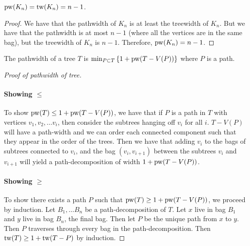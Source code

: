 \begin{example}
	\(\operatorname{pw}(K_n) = \operatorname{tw}(K_n) = n - 1\). 
\end{example}
\begin{proof}
	We have that the pathwidth of \(K_n\) is at least the treewidth of \(K_n\). But we have that the pathwidth is at most \(n- 1\) (where all the vertices are in the same bag), but the treewidth of \(K_n\) is \(n - 1\). Therefore, \(\operatorname{pw}(K_n) = n - 1\). 
\end{proof}

\begin{theorem}
	The pathwidth of a tree \(T\) is \(\min_{P \subset T} \left\lbrace 1 + \operatorname{pw}(T - V(P))\right\rbrace \) where \(P\) is a path.
\end{theorem}

\begin{proof}[Proof of pathwidth of tree]
	\item
	\paragraph{Showing \(\leq\)}
	To show \(\operatorname{pw}(T) \leq 1 + \operatorname{pw}(T - V(P))\), we have that if \(P\) is a path in \(T\) with vertices \(v_1, v_2, \ldots v_i\), then consider the subtrees hanging off \(v_i\) for all \(i\). \(T - V(P)\) will have a path-width and we can order each connected component such that they appear in the order of the trees. Then we have that adding \(v_i\) to the bags of subtrees connected to \(v_i\), and the bag \((v_i, v_{i+1})\) between the subtrees \(v_i\) and \(v_{i + 1}\) will yield a path-decomposition of width \(1 + \operatorname{pw}(T - V(P))\). 
	\item
	\paragraph{Showing \(\geq\)}
	To show there exists a path \(P\) such that \(\operatorname{pw}(T) \geq 1 + \operatorname{pw}(T - V(P))\), we proceed by induction. Let \(B_1, \ldots B_n\) be a path-decomposition of \(T\). Let \(x\) live in bag \(B_1\) and \(y\) live in bag \(B_n\), the final bag. Then let \(P\) be the unique path from \(x\) to \(y\). Then \(P\) traverses through every bag in the path-decomposition. Then \(\operatorname{tw}(T) \geq 1 + \operatorname{tw}(T - P)\) by induction. 
\end{proof}
